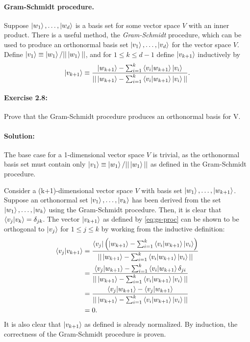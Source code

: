 \documentclass{article}
\begin{document}
\paragraph{Gram-Schmidt procedure.} Suppose $\ket{w_1}, \ldots, \ket{w_d}$ is a
basis set for some vector space $V$ with an inner product. There is a useful
method, the \emph{Gram-Schmidt} procedure, which can be used to produce an
orthonormal basis set $\ket{v_1}, \ldots, \ket{v_d}$ for the vector space $V$.
Define $\ket{v_1} \equiv \ket{w_1}/||\ket{w_1}||$, and for $1 \leq k \leq d -
1$ define $\ket{v_{k+1}}$ inductively by \begin{equation}
  \ket{v_{k+1}} \equiv \frac{\ket{w_{k+1}} - \sum_{i=1}^k \braket{v_i}{w_{k+1}}
    \ket{v_i}}{||\ket{w_{k+1}} - \sum_{i=1}^k \braket{v_i}{w_{k+1}}
    \ket{v_i}||}. \label{eq:gs-proc}
\end{equation}

\paragraph{\cite{mikeandike} Exercise 2.8:} Prove that the Gram-Schmidt
procedure produces an orthonormal basis for V.

\paragraph{Solution:} The base case for a 1-dimensional vector space $V$ is
trivial, as the orthonormal basis set must contain only $\ket{v_1} \equiv
\ket{w_1}/||\ket{w_1}||$ as defined in the Gram-Schmidt procedure.

Consider a (k+1)-dimensional vector space $V$ with basis set $\ket{w_1},
\ldots, \ket{w_{k+1}}$. Suppose an orthonormal set $\ket{v_1}, \ldots,
\ket{v_k}$ has been derived from the set $\ket{w_1}, \ldots, \ket{w_k}$ using
the Gram-Schmidt procedure. Then, it is clear that $\braket{v_j}{v_k} =
\delta_{jk}$. The vector $\ket{v_{k+1}}$ as defined by \eqref{eq:gs-proc} can
be shown to be orthogonal to $\ket{v_j}$ for $1 \leq j \leq k$ by working from
the inductive definition: \begin{align*}
  \braket{v_j}{v_{k+1}}
    &= \frac{\bra{v_j} \left(\ket{w_{k+1}} - \sum_{i=1}^k
      \braket{v_i}{w_{k+1}}\ket{v_i}\right)}{||\ket{w_{k+1}} - \sum_{i=1}^k
      \braket{v_i}{w_{k+1}}\ket{v_i}||} \\
    &= \frac{\braket{v_j}{w_{k+1}} - \sum_{i=1}^k \braket{v_i}{w_{k+1}}
      \delta_{ji}}{||\ket{w_{k+1}} - \sum_{i=1}^k \braket{v_i}{w_{k+1}}
      \ket{v_i}||} \\
    &= \frac{\braket{v_j}{w_{k+1}} - \braket{v_j}{w_{k+1}}}{||\ket{w_{k+1}} -
      \sum_{i=1}^k \braket{v_i}{w_{k+1}}\ket{v_i}||} \\
    &= 0.
\end{align*} It is also clear that $\ket{v_{k+1}}$ as defined is already
normalized. By induction, the correctness of the Gram-Schmidt procedure is
proven.
\end{document}
